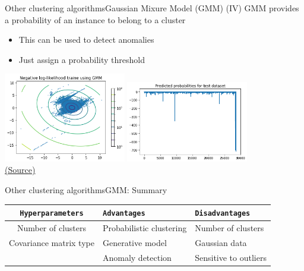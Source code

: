 \documentclass[10pt,compress]{beamer} %
\begin{document}
\begin{frame}{Other clustering algorithms}{Gaussian Mixure Model (GMM) (IV)}
    GMM provides a probability of an instance to belong to a cluster
    \begin{itemize}
         \item This can be used to detect anomalies
         \item Just assign a probability threshold
    \end{itemize} 
    
    \bigskip

    \centering
	\includegraphics[width=0.4\textwidth]{figs/gmm-anomaly.png}
	\includegraphics[width=0.4\textwidth]{figs/gmm-anomaly2.png}\\
	\scriptsize\href{https://www.kaggle.com/code/albertmistu/detect-anomalies-using-gmm}{(Source)}
\end{frame}


\begin{frame}{Other clustering algorithms}{GMM: Summary}
	\begin{center}
	\begin{tabular}{cp{3cm}p{3cm}}\hline
	 	\texttt{Hyperparameters}  & \texttt{Advantages}      & \texttt{Disadvantages} \\\hline
	 	Number of clusters        & Probabilistic clustering & Number of clusters \\
	    Covariance matrix type	  & Generative model         & Gaussian data \\
	    	                      & Anomaly detection        & Sensitive to outliers \\
	 	\hline
	\end{tabular}
	\end{center}
\end{frame}
\end{document}
